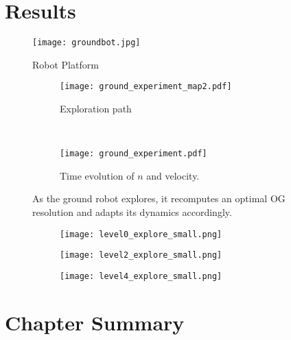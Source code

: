 \section{Results}

\begin{figure}
  \centering
  \texttt{[image: groundbot.jpg]}
  \caption{Robot Platform\label{fig:robot_platform}}
\end{figure}

\begin{figure}
  \centering
  \begin{subfigure}[t]{0.64\textwidth}
    \centering
    \texttt{[image: ground\_experiment\_map2.pdf]}
    \caption{Exploration path \label{fig:ib_exploration_path}}
  \end{subfigure}
  \\
  \begin{subfigure}[t]{0.8\textwidth}
    \centering
    \texttt{[image: ground\_experiment.pdf]}
    \caption{Time evolution of $n$ and velocity.\label{fig:ib_exploration_plots}}
  \end{subfigure}
  \caption{As the ground robot explores, it recomputes an optimal OG resolution and adapts its dynamics accordingly.\label{fig:ground_experiment}}
\end{figure}

\begin{figure}
  \centering
  \begin{subfigure}[t]{0.3\textwidth}
    \centering
    \texttt{[image: level0\_explore\_small.png]}
    \caption{\label{fig:}}
  \end{subfigure}
  \hfill
  \begin{subfigure}[t]{0.3\textwidth}
    \centering
    \texttt{[image: level2\_explore\_small.png]}
    \caption{\label{fig:}}
  \end{subfigure}
  \hfill
  \begin{subfigure}[t]{0.3\textwidth}
    \centering
    \texttt{[image: level4\_explore\_small.png]}
    \caption{\label{fig:}}
  \end{subfigure}
  \caption{\label{fig:}}
\end{figure}



\section{Chapter Summary}
